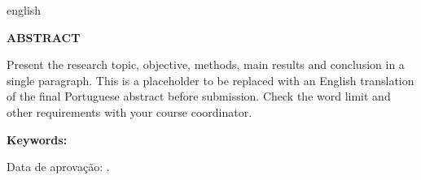 %
\begin{otherlanguage*}{english}
\begin{center}
  \textbf{ABSTRACT}
\end{center}

\begingroup
\SingleSpacing
\noindent Present the research topic, objective, methods, main results and
conclusion in a single paragraph. This is a placeholder to be replaced with
an English translation of the final Portuguese abstract before submission.
Check the word limit and other requirements with your course coordinator.
\par
\noindent\textbf{Keywords:} \keywords
\par
\endgroup
\end{otherlanguage*}

\begin{flushleft}
  Data de aprovação: \imprimirdataapresentacao.
\end{flushleft}
